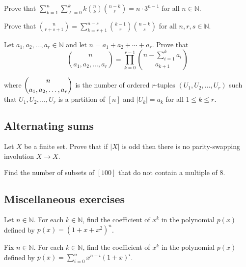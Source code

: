 \begin{chapex}
Prove that $\displaystyle \sum_{k=1}^n \sum_{\ell = 0}^k k \binom{n}{k} \binom{n-k}{\ell} = n \cdot 3^{n-1}$ for all $n \in \mathbb{N}$.
\end{chapex}

\begin{chapex}
Prove that $\displaystyle \binom{n}{r+s+1} = \sum_{k=r+1}^{n-s} \binom{k-1}{r} \binom{n-k}{s}$ for all $n,r,s \in \mathbb{N}$.
\end{chapex}

\begin{chapex}
Let $a_1,a_2,\dots,a_r \in \mathbb{N}$ and let $n = a_1 + a_2 + \cdots + a_r$. Prove that
\[
\binom{n}{a_1,a_2,\dots,a_r} = \prod_{k=0}^{r-1} \binom{n - \sum_{i=1}^k a_i}{a_{k+1}}
\]
\end{chapex}
where $\dbinom{n}{a_1,a_2,\dots,a_r}$ is the number of ordered $r$-tuples $(U_1, U_2, \dots, U_r)$ such that $U_1, U_2, \dots, U_r$ is a partition of $[n]$ and $|U_k| = a_k$ for all $1 \le k \le r$.

\subsection*{Alternating sums}

\begin{chapex}
Let $X$ be a finite set. Prove that if $|X|$ is odd then there is no parity-swapping involution $X \to X$.
\end{chapex}

\begin{chapex}
Find the number of subsets of $[100]$ that do not contain a multiple of $8$.
\end{chapex}

\subsection*{Miscellaneous exercises}

\begin{chapex}
Let $n \in \mathbb{N}$. For each $k \in \mathbb{N}$, find the coefficient of $x^k$ in the polynomial $p(x)$ defined by $p(x) = (1+x+x^2)^n$.
\end{chapex}

\begin{chapex}
Fix $n \in \mathbb{N}$. For each $k \in \mathbb{N}$, find the coefficient of $x^k$ in the polynomial $p(x)$ defined by $p(x) = \sum_{i=0}^n x^{n-i}(1+x)^i$.
\end{chapex}

